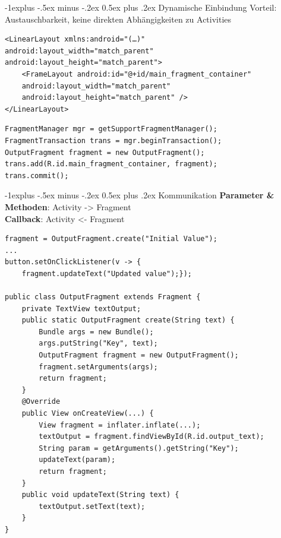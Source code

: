 \documentclass[10pt,landscape,a4paper]{article}
\makeatletter
\renewcommand{\subsection}{\@startsection{subsection}{2}{0mm}%
                                {-1explus -.5ex minus -.2ex}%
                                {0.5ex plus .2ex}%
                                {\normalfont\small\bfseries}}
\makeatother
\begin{document}
\begin{multicols*}{3}
\subsection{Dynamische Einbindung}
Vorteil: Austauschbarkeit, keine direkten Abhängigkeiten zu Activities
\begin{verbatim}
<LinearLayout xmlns:android="(…)"
android:layout_width="match_parent"
android:layout_height="match_parent">
    <FrameLayout android:id="@+id/main_fragment_container"
    android:layout_width="match_parent"
    android:layout_height="match_parent" />
</LinearLayout>
\end{verbatim}
\begin{verbatim}
FragmentManager mgr = getSupportFragmentManager();
FragmentTransaction trans = mgr.beginTransaction();
OutputFragment fragment = new OutputFragment();
trans.add(R.id.main_fragment_container, fragment);
trans.commit();
\end{verbatim}
\subsection{Kommunikation}
\textbf{Parameter \& Methoden}: Activity -> Fragment\\
\textbf{Callback}: Activity <- Fragment
\begin{verbatim}
fragment = OutputFragment.create("Initial Value");
...
button.setOnClickListener(v -> {
    fragment.updateText("Updated value");});

public class OutputFragment extends Fragment {
    private TextView textOutput;
    public static OutputFragment create(String text) {
        Bundle args = new Bundle();
        args.putString("Key", text);
        OutputFragment fragment = new OutputFragment();
        fragment.setArguments(args);
        return fragment;
    }
    @Override
    public View onCreateView(...) {
        View fragment = inflater.inflate(...);
        textOutput = fragment.findViewById(R.id.output_text);
        String param = getArguments().getString("Key");
        updateText(param);
        return fragment;
    }
    public void updateText(String text) {
        textOutput.setText(text);
    }
}
\end{verbatim}


\end{multicols*}
\end{document}
